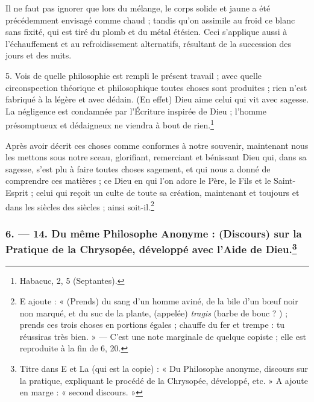 \documentclass[a4paper, 11pt, oneside, polutonikogreek, french]{article}
\begin{document}
Il ne faut pas ignorer que lors du mélange, le corps solide et jaune a été précédemment envisagé comme chaud ; tandis qu'on assimile au froid ce blanc sans fixité, qui est tiré du plomb et du métal étésien. Ceci s'applique aussi à l'échauffement et au refroidissement alternatifs, résultant de la succession des jours et des nuits.

5. Vois de quelle philosophie est rempli le présent travail ; avec quelle circonspection théorique et philosophique toutes choses sont produites ; rien n'est fabriqué à la légère et avec dédain. (En effet) Dieu aime celui qui vit avec sagesse. La négligence est condamnée par l'Écriture inspirée de Dieu ; l'homme présomptueux et dédaigneux ne viendra à bout de rien.\footnote{Habacuc, 2, 5 (Septantes).}

Après avoir décrit ces choses comme conformes à notre souvenir, maintenant nous les mettons sous notre sceau, glorifiant, remerciant et bénissant Dieu qui, dans sa sagesse, s'est plu à faire toutes choses sagement, et qui nous a donné de comprendre ces matières ; ce Dieu en qui l'on adore le Père, le Fils et le Saint-Esprit ; celui qui reçoit un culte de toute sa création, maintenant et toujours et dans les siècles des siècles ; ainsi soit-il.\footnote{E ajoute : « (Prends) du sang d'un homme aviné, de la bile d'un bœuf noir non marqué, et du suc de la plante, (appelée) \emph{tragis} (barbe de bouc ? ) ; prends ces trois choses en portions égales ; chauffe du fer et trempe : tu réussiras très bien. » --- C'est une note marginale de quelque copiste ; elle est reproduite à la fin de 6, 20.}

\bigskip
\centerline{\EightStarTaper}
\centerline{\EightStarTaper\EightStarTaper}
\bigskip

\subsubsection[6. --- 14. Du même Philosophe Anonyme : (Discours) sur la Pratique de la Chrysopée, développé avec l'Aide de Dieu.]{6. --- 14. Du même Philosophe Anonyme : (Discours) sur la Pratique de la Chrysopée, développé avec l'Aide de Dieu.\footnote{Titre dans E et La (qui est la copie) : « Du Philosophe anonyme, discours sur la pratique, expliquant le procédé de la Chrysopée, développé, etc. » A ajoute en marge : « second discours. »}}
\end{document}
